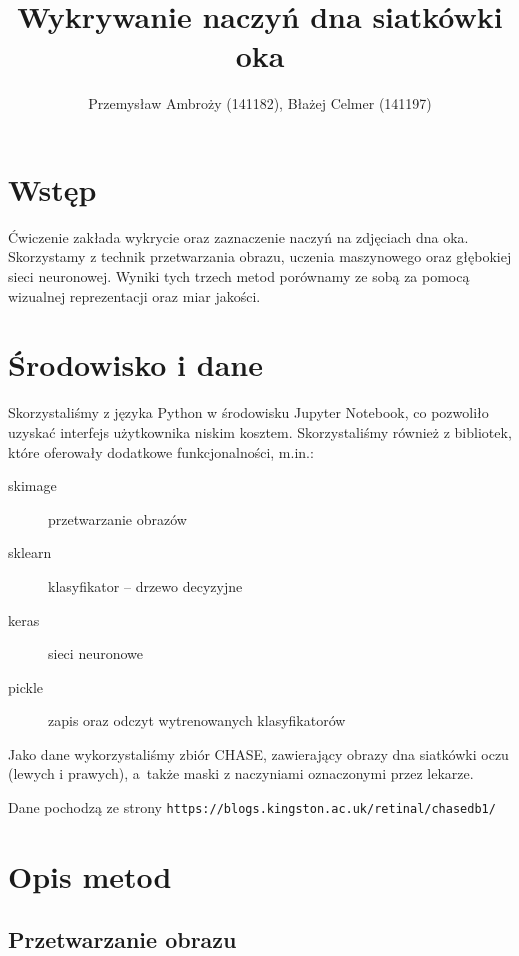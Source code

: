 \documentclass[polish,polish,a4paper]{article}
\title{Wykrywanie naczyń dna siatkówki oka}
\author{Przemysław Ambroży (141182), Błażej Celmer (141197)}
\begin{document}
 
	\maketitle
	
	\section{Wstęp}
		Ćwiczenie zakłada wykrycie oraz zaznaczenie naczyń na zdjęciach dna oka. 
		Skorzystamy z technik przetwarzania obrazu, uczenia maszynowego oraz głębokiej sieci neuronowej.
		Wyniki tych trzech metod porównamy ze sobą za pomocą wizualnej reprezentacji oraz miar jakości.
		
	\section{Środowisko i dane}
		Skorzystaliśmy z języka Python w środowisku Jupyter Notebook,
		co pozwoliło uzyskać interfejs użytkownika niskim kosztem.
		Skorzystaliśmy również z bibliotek, które oferowały dodatkowe funkcjonalności, m.in.:
		
		\begin{description}
			\item[skimage] przetwarzanie obrazów
			\item [sklearn] klasyfikator -- drzewo decyzyjne
			\item [keras] sieci neuronowe 
			\item [pickle] zapis oraz odczyt wytrenowanych klasyfikatorów
		\end{description}
		
		Jako dane wykorzystaliśmy zbiór CHASE, zawierający obrazy dna siatkówki oczu (lewych i prawych),
		a~także maski z naczyniami oznaczonymi przez lekarze.
		
		Dane pochodzą ze strony \texttt{https://blogs.kingston.ac.uk/retinal/chasedb1/}
		
	\section{Opis metod}
		\subsection{Przetwarzanie obrazu}
		
\end{document}
